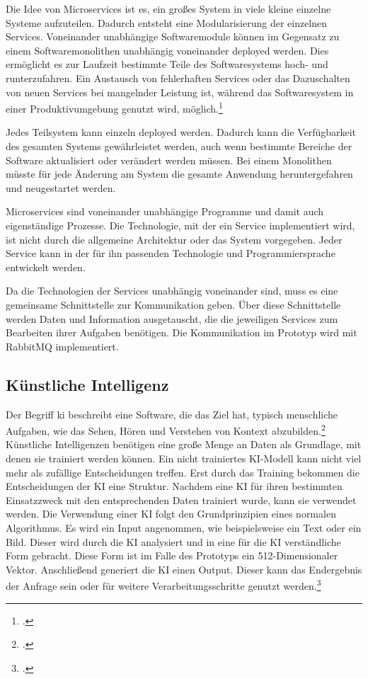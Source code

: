 Die Idee von Microservices ist es, ein großes System in viele kleine einzelne Systeme aufzuteilen. Dadurch entsteht eine Modularisierung der einzelnen Services. Voneinander unabhängige Softwaremodule können im Gegensatz zu einem Softwaremonolithen unabhängig voneinander deployed werden. Dies ermöglicht es zur Laufzeit bestimmte Teile des Softwaresystems hoch- und runterzufahren. Ein Austausch von fehlerhaften Services oder das Dazuschalten von neuen Services bei mangelnder Leistung ist, während das Softwaresystem in einer Produktivumgebung genutzt wird, möglich.\footcite{newman2015microservices}

Jedes Teilsystem kann einzeln deployed werden. Dadurch kann die Verfügbarkeit des gesamten Systems gewährleistet werden, auch wenn bestimmte Bereiche der Software aktualisiert oder verändert werden müssen. Bei einem Monolithen müsste für jede Änderung am System die gesamte Anwendung heruntergefahren und neugestartet werden.  

Microservices sind voneinander unabhängige Programme und damit auch eigenständige Prozesse. Die Technologie, mit der ein Service implementiert wird, ist nicht durch die allgemeine Architektur oder das System vorgegeben. Jeder Service kann in der für ihn passenden Technologie und Programmiersprache entwickelt werden. 

Da die Technologien der Services unabhängig voneinander sind, muss es eine gemeinsame Schnittstelle zur Kommunikation geben. Über diese Schnittstelle werden Daten und Information ausgetauscht, die die jeweiligen Services zum Bearbeiten ihrer Aufgaben benötigen. Die Kommunikation im Prototyp wird mit RabbitMQ implementiert. 

\subsection{Künstliche Intelligenz}
Der Begriff \ac{ki} beschreibt eine Software, die das Ziel hat, typisch menschliche Aufgaben, wie das Sehen, Hören und Verstehen von Kontext abzubilden.\footcite{gorz2010handbuch} 
Künstliche Intelligenzen benötigen eine große Menge an Daten als Grundlage, mit denen sie trainiert werden können. Ein nicht trainiertes KI-Modell kann nicht viel mehr als zufällige Entscheidungen treffen. Erst durch das Training bekommen die Entscheidungen der KI eine Struktur. Nachdem eine KI für ihren bestimmten Einsatzzweck mit den entsprechenden Daten trainiert wurde, kann sie verwendet werden. Die Verwendung einer KI folgt den Grundprinzipien eines normalen Algorithmus. Es wird ein Input angenommen, wie beispielsweise ein Text oder ein Bild. Dieser wird durch die KI analysiert und in eine für die KI verständliche Form gebracht. Diese Form ist im Falle des Prototyps ein 512-Dimensionaler Vektor. Anschließend generiert die KI einen Output. Dieser kann das Endergebnis der Anfrage sein oder für weitere Verarbeitungsschritte genutzt werden.\footcite{hamet2017artificial}

